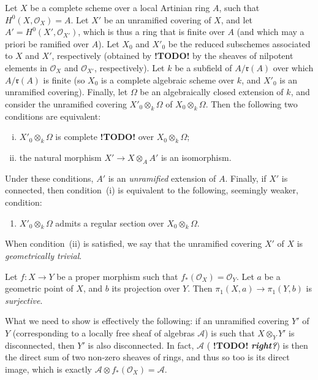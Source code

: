 \documentclass{article}
\theoremstyle{plain}
\newenvironment{lemma}[1]
  {\renewcommand\theinnercustomlemma{#1}\innercustomlemma}
  {\endinnercustomlemma}
\theoremstyle{definition}
\newcommand{\sh}{\mathscr}
\newcommand{\fk}{\mathfrak}
\newcommand{\todo}{\textbf{ !TODO! }}
\newcommand{\oldpage}[1]{\marginpar{\footnotesize$\Big\vert$ \textit{p.~#1}}}
\begin{document}
\begin{lemma}{3}
\label{lemma3}
  Let $X$ be a complete scheme over a local Artinian ring $A$, such that $H^0(X,\sh{O}_X)=A$.
  Let $X'$ be an unramified covering of $X$, and let $A'=H^0(X',\sh{O}_{X'})$, which is thus a ring that is finite over $A$ (and which may a priori be ramified over $A$).
  Let $X_0$ and $X'_0$ be the reduced subschemes associated to $X$ and $X'$, respectively (obtained by \todo by the sheaves of nilpotent elements in $\sh{O}_X$ and $\sh{O}_{X'}$, respectively).
  Let $k$ be a subfield of $A/\fk{r}(A)$ over which $A/\fk{r}(A)$ is finite (so $X_0$ is a complete algebraic scheme over $k$, and $X'_0$ is an unramified covering).
  Finally, let $\Omega$ be an algebraically closed extension of $k$, and consider the unramified covering $X'_0\otimes_k\Omega$ of $X_0\otimes_k\Omega$.
  Then the following two conditions are equivalent:
\oldpage{182-20}
  \begin{enumerate}[i.]
    \item $X'_0\otimes_k\Omega$ is complete \todo over $X_0\otimes_k\Omega$;
    \item the natural morphism $X'\to X\otimes_AA'$ is an isomorphism.
  \end{enumerate}

  Under these conditions, $A'$ is an \emph{unramified} extension of $A$.
  Finally, if $X'$ is connected, then condition~(i) is equivalent to the following, seemingly weaker, condition:
  \begin{enumerate}[i bis.]
    \item $X'_0\otimes_k\Omega$ admits a regular section over $X_0\otimes_k\Omega$.
  \end{enumerate}
\end{lemma}

When condition~(ii) is satisfied, we say that the unramified covering $X'$ of $X$ is \emph{geometrically trivial}.

\begin{lemma}{4}
\label{lemma4}
  Let $f\colon X\to Y$ be a proper morphism such that $f_*(\sh{O}_X)=\sh{O}_Y$.
  Let $a$ be a geometric point of $X$, and $b$ its projection over $Y$.
  Then $\pi_1(X,a)\to\pi_1(Y,b)$ is \emph{surjective}.
\end{lemma}

What we need to show is effectively the following: if an unramified covering $Y'$ of $Y$ (corresponding to a locally free sheaf of algebras $\sh{A}$) is such that $X\otimes_YY'$ is disconnected, then $Y'$ is also disconnected.
In fact, $\sh{A}$ (\todo \emph{\textbf{right?}}) is then the direct sum of two non-zero sheaves of rings, and thus so too is its direct image, which is exactly $\sh{A}\otimes f_*(\sh{O}_X)=\sh{A}$.
\end{document}
